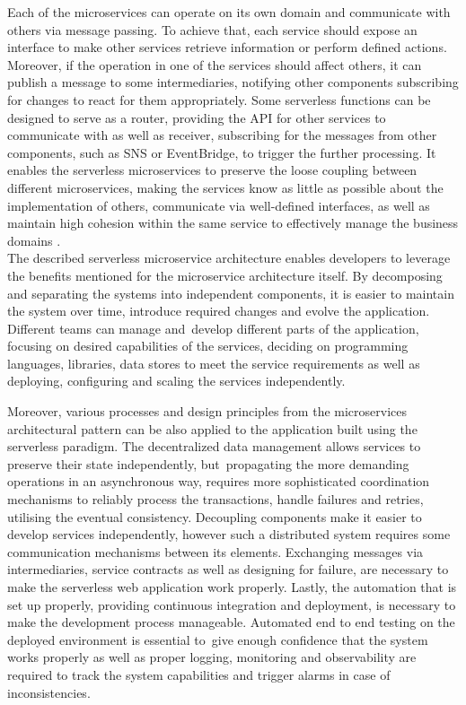 Each of the microservices can operate on its own domain and communicate with others via message passing.
To achieve that, each service should expose an interface to make other services retrieve information or perform defined actions.
Moreover, if the operation in one of the services should affect others, it can publish a message to some intermediaries, notifying other components subscribing for changes to react for them appropriately.
Some serverless functions can be designed to serve as a router, providing the API for other services to communicate with as well as receiver, subscribing for the messages from other components, such as SNS or EventBridge, to trigger the further processing.
It enables the serverless microservices to preserve the loose coupling between different microservices, making the services know as little as possible about the implementation of others, communicate via well-defined interfaces, as well as maintain high cohesion within the same service to effectively manage the business domains \cite{AnIntroductionToServerlessMicroservices}. \\

The described serverless microservice architecture enables developers to leverage the benefits mentioned for the microservice architecture itself.
By decomposing and separating the systems into independent components, it is easier to maintain the system over time, introduce required changes and evolve the application. Different teams can manage and~develop different parts of the application, focusing on desired capabilities of the services, deciding on programming languages, libraries, data stores to meet the service requirements as well as deploying, configuring and scaling the services independently.

Moreover, various processes and design principles from the microservices architectural pattern can be also applied to the application built using the serverless paradigm.
The decentralized data management allows services to preserve their state independently, but~propagating the more demanding operations in an asynchronous way, requires more sophisticated coordination mechanisms to reliably process the transactions, handle failures and retries, utilising the eventual consistency.
Decoupling components make it easier to develop services independently, however such a distributed system requires some communication mechanisms between its elements.
Exchanging messages via intermediaries, service contracts as well as designing for failure, are necessary to make the serverless web application work properly.
Lastly, the automation that is set up properly, providing continuous integration and deployment, is necessary to make the development process manageable.
Automated end to end testing on the deployed environment is essential to~give enough confidence that the system works properly as well as proper logging, monitoring and observability are required to track the system capabilities and trigger alarms in case of inconsistencies. \newline

